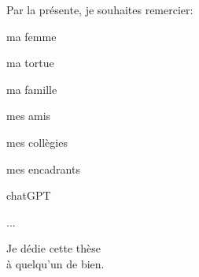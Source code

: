 \documentclass[11pt]{template/thesul}
\begin{document}

\begin{ThesisAcknowledgments}

    Par la présente, je souhaites remercier:
    \begin{todolist}
        \item ma femme
        \item ma tortue
        \item ma famille
        \item mes amis
        \item mes collègies
        \item mes encadrants
        \item chatGPT
        \item ...
    \end{todolist}

\end{ThesisAcknowledgments}


\begin{ThesisDedication}

    Je dédie cette thèse\\
    à quelqu'un de bien.

\end{ThesisDedication}


\tableofcontents

\listoffigures

\listoftables


\mainmatter
\end{document}
